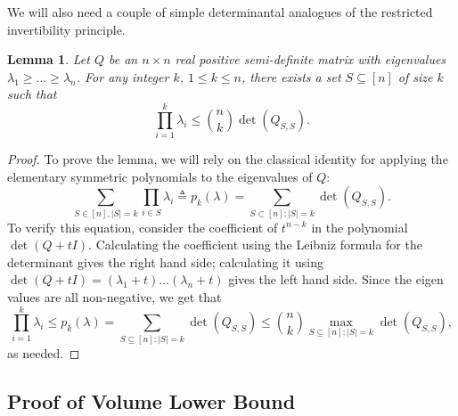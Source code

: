 \documentclass[11pt]{article}
\newtheorem{lemma}[theorem]{Lemma}
\newcommand{\eqdef}{\triangleq}
\begin{document}
We will also need a couple of simple determinantal analogues of the restricted
invertibility principle.

\begin{lemma}\label{lm:rip-det}
  Let $Q$ be an $n\times n$ real positive semi-definite matrix with
  eigenvalues $\lambda_1 \ge \ldots \ge \lambda_n$. For any integer
  $k$, $1 \le k \le n$, there exists a set $S \subseteq [n]$ of size $k$
  such that
  \[\prod_{i=1}^k \lambda_i \leq \binom{n}{k} \det(Q_{S,S}).\]
\end{lemma}
\begin{proof}
To prove the lemma, we will rely on the classical identity for applying the
elementary symmetric polynomials to the eigenvalues of $Q$:
\begin{equation*}
\sum_{S \in [n],|S|=k} \prod_{i \in S} \lambda_i \eqdef p_k(\lambda) = \sum_{S \subset [n]: |S| = k}\det(Q_{S,S}).
\end{equation*}
To verify this equation, consider the coefficient of $t^{n-k}$ in the polynomial
$\det(Q + tI)$. Calculating the coefficient using the Leibniz formula for the
determinant gives the right hand side; calculating it using $\det(Q + tI) =
(\lambda_1 + t)\ldots(\lambda_n + t)$ gives the left hand side. Since the eigen
values are all non-negative, we get that
\[
\prod_{i=1}^k \lambda_i \leq p_k(\lambda) =  
 \sum_{S \subseteq [n]: |S|=k} \det(Q_{S,S}) \leq \binom{n}{k} \max_{S
\subseteq [n]: |S|=k} \det(Q_{S,S}),
\]
as needed.
\end{proof}

\subsection{Proof of Volume Lower Bound}
\label{sec:proof-vollb}
\end{document}
